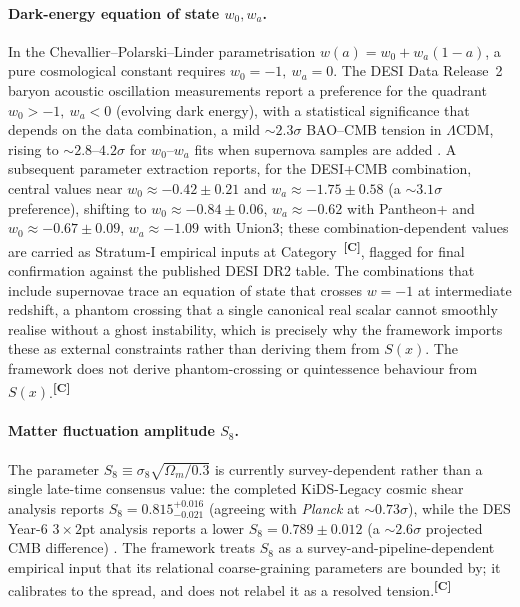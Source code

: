 \documentclass[12pt,a4paper,twoside]{article}
\theoremstyle{plain}
\theoremstyle{definition}
\theoremstyle{remark}
\newcommand{\catmark}[1]{\textsuperscript{\textsf{\textbf{[#1]}}}}
\newcommand{\Sx}{S(x)}
\begin{document}
\paragraph{Dark-energy equation of state $w_0, w_a$.}
In the Chevallier--Polarski--Linder parametrisation $w(a)=w_0+w_a(1-a)$, a pure cosmological constant requires $w_0=-1,\ w_a=0$. The DESI Data Release~2 baryon acoustic oscillation measurements report a preference for the quadrant $w_0>-1,\ w_a<0$ (evolving dark energy), with a statistical significance that depends on the data combination, a mild $\sim 2.3\sigma$ BAO--CMB tension in $\Lambda$CDM, rising to $\sim 2.8$--$4.2\sigma$ for $w_0$--$w_a$ fits when supernova samples are added \cite{desidr2}. A subsequent parameter extraction reports, for the DESI+CMB combination, central values near $w_0 \approx -0.42 \pm 0.21$ and $w_a \approx -1.75 \pm 0.58$ (a $\sim 3.1\sigma$ preference), shifting to $w_0 \approx -0.84 \pm 0.06$, $w_a \approx -0.62$ with Pantheon+ and $w_0 \approx -0.67 \pm 0.09$, $w_a \approx -1.09$ with Union3; these combination-dependent values are carried as Stratum-I empirical inputs at Category~\catmark{C}, flagged for final confirmation against the published DESI DR2 table. The combinations that include supernovae trace an equation of state that crosses $w=-1$ at intermediate redshift, a phantom crossing that a single canonical real scalar cannot smoothly realise without a ghost instability, which is precisely why the framework imports these as external constraints rather than deriving them from $\Sx$. The framework does not derive phantom-crossing or quintessence behaviour from $\Sx$.\catmark{C}

\paragraph{Matter fluctuation amplitude $S_8$.}
The parameter $S_8\equiv\sigma_8\sqrt{\Omega_m/0.3}$ is currently survey-dependent rather than a single late-time consensus value: the completed KiDS-Legacy cosmic shear analysis reports $S_8 = 0.815^{+0.016}_{-0.021}$ (agreeing with \textit{Planck} at $\sim 0.73\sigma$), while the DES Year-6 $3\times2$pt analysis reports a lower $S_8 = 0.789 \pm 0.012$ (a $\sim 2.6\sigma$ projected CMB difference) \cite{kids2025,des2026}. The framework treats $S_8$ as a survey-and-pipeline-dependent empirical input that its relational coarse-graining parameters are bounded by; it calibrates to the spread, and does not relabel it as a resolved tension.\catmark{C}
\end{document}
